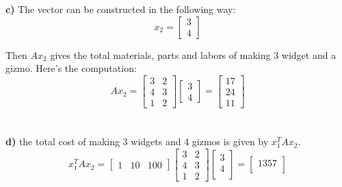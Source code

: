 \documentclass[paper=a4, fontsize=11pt]{scrartcl} %
\numberwithin{equation}{section} %
\numberwithin{figure}{section} %
\numberwithin{table}{section} %
\begin{document}
\textbf{c)} The vector can be constructed in the following way: 
\[ 
x_2=
\left[ \begin{array}{c}
3  \\
4 
\end{array} \right]
\]

Then $A x_2$ gives the total materials, parts and labors of making 3 widget and a gizmo. Here's the computation: 
\[ 
A x_2= 
\left[ \begin{array}{cc}
3 & 2 \\
4 & 3 \\
1 & 2
\end{array} \right]
%
\left[ \begin{array}{c}
3  \\
4 
\end{array} \right]
=
\left[ \begin{array}{c}
17 \\
24 \\
11
\end{array} \right]
\]\\\\



\textbf{d)} the total cost of making 3 widgets and 4 gizmos is given by $x_1^T A x_2 $.
\[ 
x_1^T A x_2 = 
\left[ \begin{array}{ccc}
1 & 10 & 100
\end{array} \right]
%
\left[ \begin{array}{cc}
3 & 2 \\
4 & 3 \\
1 & 2
\end{array} \right]
%
\left[ \begin{array}{c}
3 \\
4 \\
\end{array} \right]
=
\left[ \begin{array}{c}
1357 \\
\end{array} \right]
\]\\\\
\end{document}
